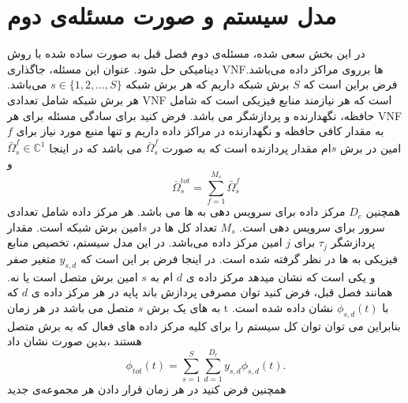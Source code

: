 \section{ مدل سیستم و صورت مسئله‌ی دوم}
در این بخش سعی شده، مسئله‌ی دوم فصل قبل به صورت ساده شده با روش دینامیکی حل شود. عنوان این مسئله، جاگذاری VNFها برروی مراکز داده می‌باشد.
فرض براین است که $S$ برش شبکه داریم که هر برش شبکه
$s\in \{1,2,...,S \} $
می‌باشد. هر برش شبکه شامل تعدادی VNF است که
هر 
نیازمند منابع فیزیکی است که شامل حافظه، نگهدارنده و پردازشگر می باشد.
فرض کنید برای سادگی مسئله برای هر VNF به مقدار کافی حافظه و نگهدارنده در مراکز داده داریم و تنها منبع مورد نیاز برای $f$ امین  در برش $s$ام مقدار پردازنده است که به صورت $\bar{\Omega}_{s}^f$ می باشد 
که در اینجا 
$\bar{\Omega}_{s}^f\in \mathbb{C}^{1}$
و
\begin{equation}
	\textstyle \bar{\Omega}_{s}^{tot} = \sum_{f=1}^{M_{s}}\bar{\Omega}_{s}^f %
\end{equation}
همچنین $D_c$ مرکز داده برای سرویس دهی به  ها می باشد. هر مرکز داده شامل تعدادی سرور برای سرویس دهی است.
$M_s$ 
تعداد کل
ها در $s$امین برش شبکه است.
مقدار پردازشگر 
$\tau_{j} $
برای 
$j$
امین مرکز داده  می‌باشد.
در این مدل سیستم، 
تخصیص منابع فیزیکی به  ها در نظر گرفته شده است. 
در اینجا فرض بر این است که $y_{s,d}$ متغیر صفر و یکی است که نشان میدهد مرکز داده ی $d$ ام به $s$ امین برش متصل است یا نه. 
همانند فصل قبل، 
فرض کنید توان مصرفی پردازش باند پایه در هر مرکز داده ی $d$ که به  های یک برش $s$ متصل می باشد در هر زمان t با   
$\phi_{s,d}(t)$
نشان داده شده است.
بنابراین می توان توان کل سیستم را برای کلیه مرکز داده های فعال که به برش متصل هستند ،بدین صورت نشان داد
\begin{equation*}
	\textstyle \phi_{tot}(t) = \sum_{s=1}^{S}\sum_{d=1}^{D_c}y_{s,d}\phi_{s,d}(t).
\end{equation*}
همچنین فرض کنید در هر زمان قرار دادن هر مجموعه‌ی جدید
